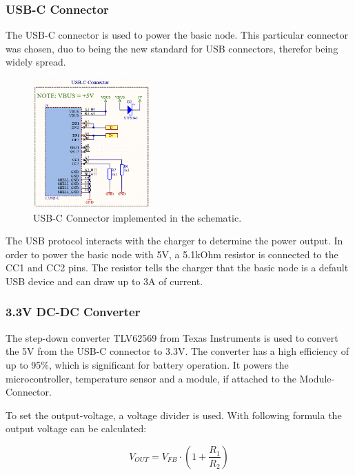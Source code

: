     \subsubsection{USB-C Connector}

    The USB-C connector is used to power the basic node. This particular connector was
    chosen, duo to being the new standard for USB connectors, therefor being widely spread.
    
    \begin{figure}[H]
        \centering
        \includegraphics[width=0.4\textwidth]{assets/HW/USB-C-schematic.png}
        \caption{USB-C Connector implemented in the schematic.}
    \end{figure}

    The USB protocol interacts with the charger to determine the power output. In order to
    power the basic node with 5V, a 5.1kOhm resistor is connected to the CC1 and CC2 pins.
    The resistor tells the charger that the basic node is a default USB device and can draw
    up to 3A of current. 
    \cite{noauthor_fugen_2023}
    
    \subsubsection{3.3V DC-DC Converter}

    The  step-down converter TLV62569 from Texas Instruments is used to convert 
    the 5V from the USB-C connector to 3.3V. The converter has a high efficiency
    of up to 95\%, which is significant for battery operation. It powers the
    microcontroller, temperature sensor and a module, if attached to the
    Module-Connector.

    To set the output-voltage, a voltage divider is used. With following formula
    the output voltage can be calculated:

    \begin{equation}
        V_{OUT} = V_{FB} \cdot (1 + \frac{R_1}{R_2})
    \end{equation}


